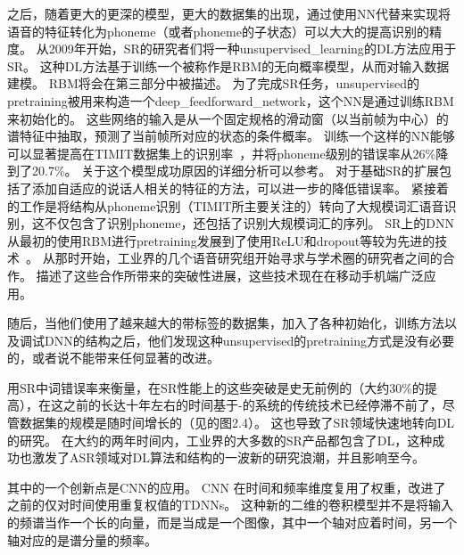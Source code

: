 之后，随着更大的更深的模型，更大的数据集的出现，通过使用\gls{NN}代替来实现将语音的特征转化为\gls{phoneme}（或者\gls{phoneme}的子状态）可以大大的提高识别的精度。
从2009年开始，\gls{SR}的研究者们将一种\gls{unsupervised_learning}的\gls{DL}方法应用于\gls{SR}。
这种\gls{DL}方法基于训练一个被称作是\gls{RBM}的无向概率模型，从而对输入数据建模。
 \gls{RBM}将会在第三部分中被描述。
 为了完成\gls{SR}任务，\gls{unsupervised}的\gls{pretraining}被用来构造一个\gls{deep_feedforward_network}，这个\gls{NN}是通过训练\gls{RBM}来初始化的。
 这些网络的输入是从一个固定规格的滑动窗（以当前帧为中心）的谱特征中抽取，预测了当前帧所对应的状态的条件概率。
 训练一个这样的\gls{NN}能够可以显著提高在TIMIT数据集上的识别率~\citep{mohamed2009deep,Mohamed+Dahl+Hinton-2012}，并将\gls{phoneme}级别的错误率从26\%降到了20.7\%。
关于这个模型成功原因的详细分析可以参考\citet{mohamed2012understanding}。
 对于基础\gls{SR}的扩展包括了添加自适应的说话人相关的特征\citep{mohamed2011deep}的方法，可以进一步的降低错误率。
 紧接着的工作是将结构从\gls{phoneme}识别（TIMIT所主要关注的）转向了大规模词汇语音识别\citep{Dahl2012}，这不仅包含了识别\gls{phoneme}，还包括了识别大规模词汇的序列。
\gls{SR}上的\gls{DNN}从最初的使用\gls{RBM}进行\gls{pretraining}发展到了使用\gls{ReLU}和\gls{dropout}等较为先进的技术~\citep{Zeiler+al-ICASSP-2013,Dahl-et-al-ICASSP2013}。
从那时开始，工业界的几个语音研究组开始寻求与学术圈的研究者之间的合作。
\citet{Hinton-et-al-2012}描述了这些合作所带来的突破性进展，这些技术现在在移动手机端广泛应用。

随后，当他们使用了越来越大的带标签的数据集，加入了各种初始化，训练方法以及调试\gls{DNN}的结构之后，他们发现这种\gls{unsupervised}的\gls{pretraining}方式是没有必要的，或者说不能带来任何显著的改进。

用\gls{SR}中词错误率来衡量，在\gls{SR}性能上的这些突破是史无前例的（大约30\%的提高），在这之前的长达十年左右的时间基于-的系统的传统技术已经停滞不前了，尽管数据集的规模是随时间增长的（见\citet{Deng+Yu-2014}的图2.4）。
这也导致了\gls{SR}领域快速地转向\gls{DL}的研究。
在大约的两年时间内，工业界的大多数的\gls{SR}产品都包含了\gls{DL}，这种成功也激发了\gls{ASR}领域对\gls{DL}算法和结构的一波新的研究浪潮，并且影响至今。

其中的一个创新点是\gls{CNN}的应用\citep{Sainath-et-al-ICASSP2013}。
\gls{CNN} 在时间和频率维度复用了权重，改进了之前的仅对时间使用重复权值的\gls{TDNNs}。
这种新的二维的卷积模型并不是将输入的频谱当作一个长的向量，而是当成是一个图像，其中一个轴对应着时间，另一个轴对应的是谱分量的频率。

